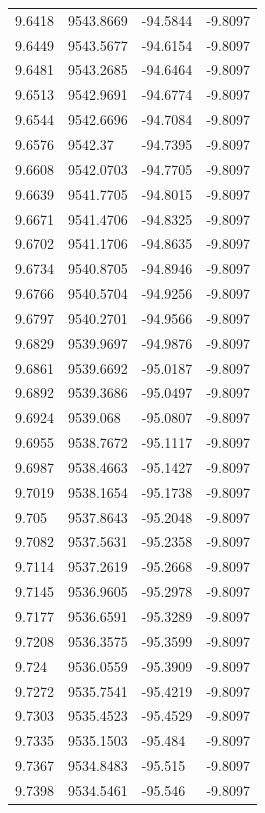 \begin{table}[H]
\begin{tabular}{llll}
9.6418 & 9543.8669 & -94.5844 & -9.8097 \\
9.6449 & 9543.5677 & -94.6154 & -9.8097 \\
9.6481 & 9543.2685 & -94.6464 & -9.8097 \\
9.6513 & 9542.9691 & -94.6774 & -9.8097 \\
9.6544 & 9542.6696 & -94.7084 & -9.8097 \\
9.6576 & 9542.37 & -94.7395 & -9.8097 \\
9.6608 & 9542.0703 & -94.7705 & -9.8097 \\
9.6639 & 9541.7705 & -94.8015 & -9.8097 \\
9.6671 & 9541.4706 & -94.8325 & -9.8097 \\
9.6702 & 9541.1706 & -94.8635 & -9.8097 \\
9.6734 & 9540.8705 & -94.8946 & -9.8097 \\
9.6766 & 9540.5704 & -94.9256 & -9.8097 \\
9.6797 & 9540.2701 & -94.9566 & -9.8097 \\
9.6829 & 9539.9697 & -94.9876 & -9.8097 \\
9.6861 & 9539.6692 & -95.0187 & -9.8097 \\
9.6892 & 9539.3686 & -95.0497 & -9.8097 \\
9.6924 & 9539.068 & -95.0807 & -9.8097 \\
9.6955 & 9538.7672 & -95.1117 & -9.8097 \\
9.6987 & 9538.4663 & -95.1427 & -9.8097 \\
9.7019 & 9538.1654 & -95.1738 & -9.8097 \\
9.705 & 9537.8643 & -95.2048 & -9.8097 \\
9.7082 & 9537.5631 & -95.2358 & -9.8097 \\
9.7114 & 9537.2619 & -95.2668 & -9.8097 \\
9.7145 & 9536.9605 & -95.2978 & -9.8097 \\
9.7177 & 9536.6591 & -95.3289 & -9.8097 \\
9.7208 & 9536.3575 & -95.3599 & -9.8097 \\
9.724 & 9536.0559 & -95.3909 & -9.8097 \\
9.7272 & 9535.7541 & -95.4219 & -9.8097 \\
9.7303 & 9535.4523 & -95.4529 & -9.8097 \\
9.7335 & 9535.1503 & -95.484 & -9.8097 \\
9.7367 & 9534.8483 & -95.515 & -9.8097 \\
9.7398 & 9534.5461 & -95.546 & -9.8097 \\

\end{tabular}
\end{table}
